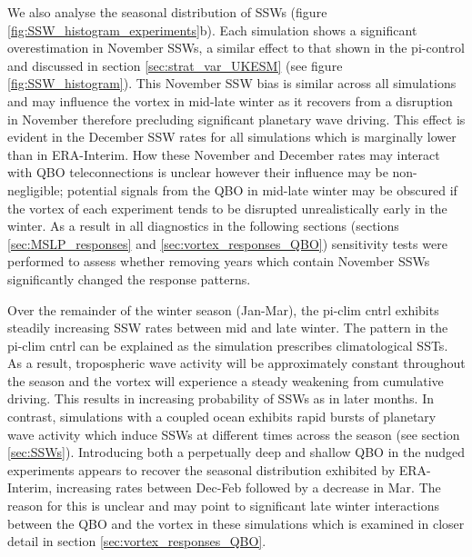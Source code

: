 We also analyse the seasonal distribution of SSWs (figure \ref{fig:SSW_histogram_experiments}b). Each simulation shows a significant overestimation in November SSWs, a similar effect to that shown in the pi-control and discussed in section \ref{sec:strat_var_UKESM} (see figure \ref{fig:SSW_histogram}). This November SSW bias is similar across all simulations and may influence the vortex in mid-late winter as it recovers from a disruption in November therefore precluding significant planetary wave driving. This effect is evident in the December SSW rates for all simulations which is marginally lower than in ERA-Interim. How these November and December rates may interact with QBO teleconnections is unclear however their influence may be non-negligible; potential signals from the QBO in mid-late winter may be obscured if the vortex of each experiment tends to be disrupted unrealistically early in the winter. As a result in all diagnostics in the following sections (sections \ref{sec:MSLP_responses} and \ref{sec:vortex_responses_QBO}) sensitivity tests were performed to assess whether removing years which contain November SSWs significantly changed the response patterns.  

Over the remainder of the winter season (Jan-Mar), the pi-clim cntrl exhibits steadily increasing SSW rates between mid and late winter. The pattern in the pi-clim cntrl can be explained as the simulation prescribes climatological SSTs. As a result, tropospheric wave activity will be approximately constant throughout the season and the vortex will experience a steady weakening from cumulative driving. This results in increasing probability of SSWs as in later months. In contrast, simulations with a coupled ocean exhibits rapid bursts of planetary wave activity which induce SSWs at different times across the season (see section \ref{sec:SSWs}). Introducing both a perpetually deep and shallow QBO in the nudged experiments appears to recover the seasonal distribution exhibited by ERA-Interim, increasing rates between Dec-Feb followed by a decrease in Mar. The reason for this is unclear and may point to significant late winter interactions between the QBO and the vortex in these simulations which is examined in closer detail in section \ref{sec:vortex_responses_QBO}.

